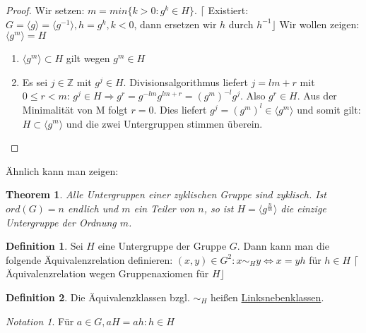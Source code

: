 \documentclass[fleqn, 12pt]{scrartcl}
\newtheorem{thm}{Theorem}
\theoremstyle{definition}
\newtheorem*{defn}{Definition}
\theoremstyle{remark}
\newtheorem*{notation}{Notation}
\begin{document}
\begin{proof}
	Wir setzen: $m = min \lbrace k>0 : g^{k} \in H \rbrace$. \newline $\lceil$ Existiert: $G= \langle g \rangle = \langle g^{-1} \rangle, h = g^{k}, k<0$, dann ersetzen wir $h$ durch $h^{-1} \rfloor$ \newline Wir wollen zeigen: $\langle g^{m} \rangle = H$ 
	\begin{enumerate}
		\item $\langle g^{m} \rangle \subset H$ gilt wegen $g^{m} \in H$
		\item Es sei $j \in  \mathbb{Z}$ mit $g^{j} \in H$. Divisionsalgorithmus liefert $j=lm+r$ mit $0 \leq r < m$: $g^{j} \in H \Rightarrow g^{r}=g^{-lm}g^{lm+r}=(g^{m})^{-l}g^{j}$. Also $g^{r} \in H$. Aus der Minimalität von M folgt $r=0$. Dies liefert $g^{j}=(g^{m})^{l} \in \langle g^{m} \rangle$ und somit gilt: $H \subset \langle g^{m} \rangle$ und die zwei Untergruppen stimmen überein.
	\end{enumerate}
\end{proof}

Ähnlich kann man zeigen:

\begin{thm}
	Alle Untergruppen einer zyklischen Gruppe sind zyklisch. Ist $ord(G)=n$ endlich und $m$ ein Teiler von $n$, so ist $H = \langle g^{\frac{n}{m}}\rangle$ die einzige Untergruppe der Ordnung $m$.
\end{thm}

\begin{defn}
	Sei $H$ eine Untergruppe der Gruppe $G$. Dann kann man die folgende Äquivalenzrelation definieren: \newline $(x,y) \in G^{2}: x \sim_{H} y \Leftrightarrow x = yh$ für $h \in H$ \newline $\lceil$Äquivalenzrelation wegen Gruppenaxiomen für $H\rfloor$
\end{defn}

\begin{defn}
	Die Äquivalenzklassen bzgl. $\sim_{H}$ heißen \underline{Linksnebenklassen}.
\end{defn}

\begin{notation}
	Für $a \in G, aH = {ah : h \in H}$
\end{notation}
\end{document}
